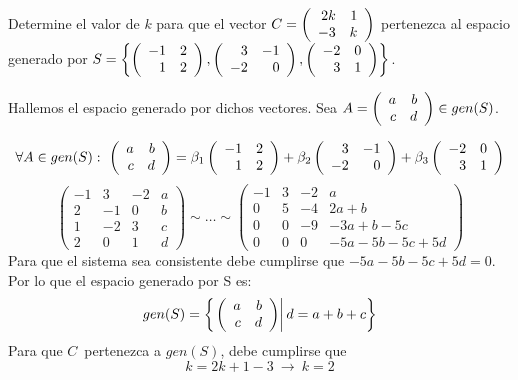 \begin{ejercicio}
Determine el valor de $k$ para que el vector $C= \left( \begin{array}{rr} 2k&1\\ -3&k \end{array} \right) $ pertenezca al espacio generado por $S=\left\{ \left( \begin{array}{rr} -1&2\\ 1&2 \end{array} \right) ,  \left( \begin{array}{rr} 3&-1\\ -2&0 \end{array} \right) ,  \left( \begin{array}{rr} -2&0\\ 3&1 \end{array} \right) \right\}$.
\end{ejercicio}
Hallemos el espacio generado por dichos vectores. Sea $A= \left( \begin{array}{rr} a&b\\ c&d \end{array} \right)  \in gen(S)$.

\[\forall A\in gen(S):\ 
\matrdxd{a&b}{c&d}=
\beta_1\matrdxd{-1&2}{1&2}+ \beta_2\matrdxd{3&-1}{-2&0}+ \beta_3\matrdxd{-2&0}{3&1}
\]
\[
\left(
\begin{array}{rrr|r}
-1&3&-2&a\\
2&-1&0&b\\
1&-2&3&c\\
2&0&1&d
\end{array}
\right)
\sim
\ldots
\sim
\left(
\begin{array}{rrr|l}
-1&3&-2&a\\
0&5&-4&2a+b\\
0&0&-9&-3a+b-5c\\
0&0&0&-5a-5b-5c+5d
\end{array}
\right)
\]
Para que el sistema sea consistente debe cumplirse que $-5a-5b-5c+5d=0$. Por lo que el espacio generado por S es:
\[gen(S)=\left\{ \left. 
 \left( \begin{array}{rr} a&b\\ c&d \end{array} \right) 
\right| d=a+b+c \right\}
\]
Para que $C$\ pertenezca a $gen(S)$, debe cumplirse que
\[k=2k+1-3\ \rightarrow\ k=2\]




